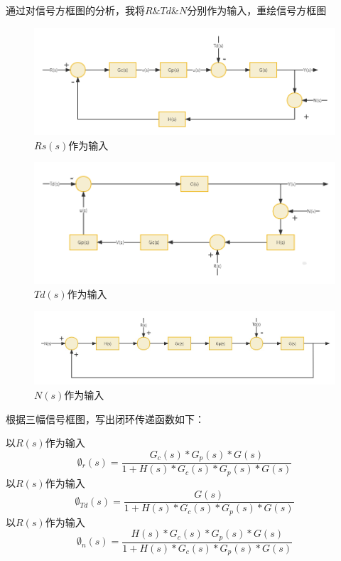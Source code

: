\documentclass{thuemp}
\begin{document}
通过对信号方框图的分析，我将$R \& Td \& N$分别作为输入，重绘信号方框图

\begin{figure}[H]
\centering
\includegraphics[width=1\linewidth]{./img/Rs.png}
\caption{$Rs(s)$作为输入} 
\end{figure}

\begin{figure}[H]
\centering
\includegraphics[width=1\linewidth]{./img/Td.png}
\caption{$Td(s)$作为输入} 
\end{figure}

\begin{figure}[H]
\centering
\includegraphics[width=1\linewidth]{./img/N.jpg}
\caption{$N(s)$作为输入} 
\end{figure}

根据三幅信号框图，写出闭环传递函数如下：

以$R(s)$作为输入
$$
\emptyset_r(s)=\frac{G_c(s)\ast G_p(s)\ast G(s)}{1+H(s)\ast G_c(s)\ast G_p(s)\ast G(s)}
$$
以$R(s)$作为输入
$$
\emptyset_{Td}\left(s\right)=\frac{G(s)}{1+H\left(s\right)\ast G_c\left(s\right)\ast G_p\left(s\right)\ast G\left(s\right)}
$$
以$R(s)$作为输入
$$
\emptyset_n(s)=\frac{H(s)\ast G_c(s)\ast G_p(s)\ast G(s)}{1+H(s)\ast G_c(s)\ast G_p(s)\ast G(s)}
$$
\end{document}
